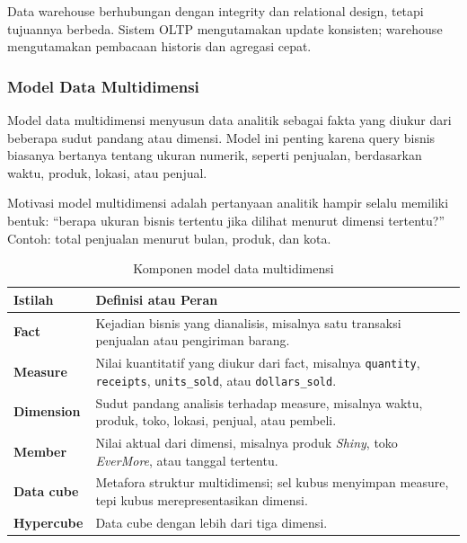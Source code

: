 Data warehouse berhubungan dengan integrity dan relational design, tetapi tujuannya berbeda. Sistem OLTP mengutamakan update konsisten; warehouse mengutamakan pembacaan historis dan agregasi cepat.

\subsubsection{Model Data Multidimensi}

\begin{jawab}
Model data multidimensi menyusun data analitik sebagai fakta yang diukur dari beberapa sudut pandang atau dimensi. Model ini penting karena query bisnis biasanya bertanya tentang ukuran numerik, seperti penjualan, berdasarkan waktu, produk, lokasi, atau penjual.
\end{jawab}

Motivasi model multidimensi adalah pertanyaan analitik hampir selalu memiliki bentuk: ``berapa ukuran bisnis tertentu jika dilihat menurut dimensi tertentu?'' Contoh: total penjualan menurut bulan, produk, dan kota.

\begin{table}[H]
\centering
\begin{tabularx}{\textwidth}{|L{0.22\textwidth}|X|}
\hline
\textbf{Istilah} & \textbf{Definisi atau Peran} \\
\hline
\textbf{Fact} & Kejadian bisnis yang dianalisis, misalnya satu transaksi penjualan atau pengiriman barang. \\
\hline
\textbf{Measure} & Nilai kuantitatif yang diukur dari fact, misalnya \texttt{quantity}, \texttt{receipts}, \texttt{units\_sold}, atau \texttt{dollars\_sold}. \\
\hline
\textbf{Dimension} & Sudut pandang analisis terhadap measure, misalnya waktu, produk, toko, lokasi, penjual, atau pembeli. \\
\hline
\textbf{Member} & Nilai aktual dari dimensi, misalnya produk \textit{Shiny}, toko \textit{EverMore}, atau tanggal tertentu. \\
\hline
\textbf{Data cube} & Metafora struktur multidimensi; sel kubus menyimpan measure, tepi kubus merepresentasikan dimensi. \\
\hline
\textbf{Hypercube} & Data cube dengan lebih dari tiga dimensi. \\
\hline
\end{tabularx}
\caption{Komponen model data multidimensi}
\label{tab:multidimensional-components}
\end{table}


